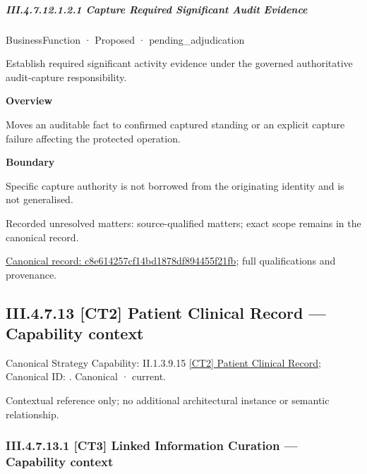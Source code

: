 \subparagraph*{III.4.7.12.1.2.1 Capture Required Significant Audit Evidence}
\label{navigation:III.4.7.12.1.2.1}

\label{element:c8e614257cf14bd1878df894455f21fb}
{\small BusinessFunction · Proposed · pending\_adjudication}\par

Establish required significant activity evidence under the governed authoritative audit-capture responsibility.



\textbf{Overview}



Moves an auditable fact to confirmed captured standing or an explicit capture failure affecting the protected operation.



\textbf{Boundary}



Specific capture authority is not borrowed from the originating identity and is not generalised.


{\small Recorded unresolved matters: source-qualified matters; exact scope remains in the canonical record.}\par
{\footnotesize \href{../../../../continuum/business/business-function/c8e614257cf14bd1878df894455f21fb.md}{Canonical record: c8e614257cf14bd1878df894455f21fb}; full qualifications and provenance.}\par
\subsection*{III.4.7.13 [CT2] Patient Clinical Record — Capability context}
\label{navigation:III.4.7.13}

{\small Canonical Strategy Capability: II.1.3.9.15 \hyperref[element:5478878e0e6e4d34a8d5023ac6ac2d54]{[CT2] Patient Clinical Record}; Canonical ID: \texttt{}. Canonical · current.}\par
Contextual reference only; no additional architectural instance or semantic relationship.\par
\subsubsection*{III.4.7.13.1 [CT3] Linked Information Curation — Capability context}
\label{navigation:III.4.7.13.1}

